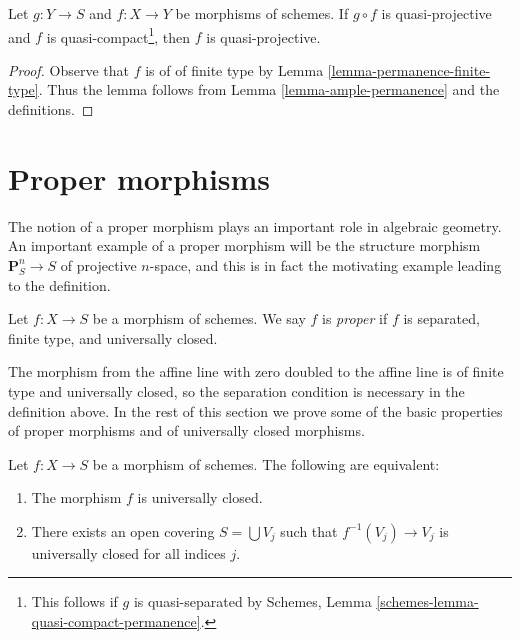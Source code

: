 \begin{lemma}
\label{lemma-quasi-projective-permanence}
Let $g : Y \to S$ and $f : X \to Y$ be morphisms of schemes.
If $g \circ f$ is quasi-projective and $f$ is
quasi-compact\footnote{This follows if $g$ is quasi-separated by
Schemes, Lemma \ref{schemes-lemma-quasi-compact-permanence}.},
then $f$ is quasi-projective.
\end{lemma}

\begin{proof}
Observe that $f$ is of of finite type by
Lemma \ref{lemma-permanence-finite-type}.
Thus the lemma follows from Lemma \ref{lemma-ample-permanence}
and the definitions.
\end{proof}





\section{Proper morphisms}
\label{section-proper}

\noindent
The notion of a proper morphism plays an important role in algebraic
geometry. An important example of a proper morphism will be the
structure morphism $\mathbf{P}^n_S \to S$ of projective $n$-space,
and this is in fact the motivating example leading to the definition.

\begin{definition}
\label{definition-proper}
Let $f : X \to S$ be a morphism of schemes.
We say $f$ is {\it proper} if $f$ is separated, finite type, and
universally closed.
\end{definition}

\noindent
The morphism from the affine line with zero doubled to the affine line
is of finite type and universally closed, so the separation condition is
necessary in the definition above.
In the rest of this section we prove some of the basic properties
of proper morphisms and of universally closed morphisms.

\begin{lemma}
\label{lemma-universally-closed-local-on-the-base}
Let $f : X \to S$ be a morphism of schemes.
The following are equivalent:
\begin{enumerate}
\item The morphism $f$ is universally closed.
\item There exists an open covering $S = \bigcup V_j$ such
that $f^{-1}(V_j) \to V_j$ is universally closed for all indices $j$.
\end{enumerate}
\end{lemma}

